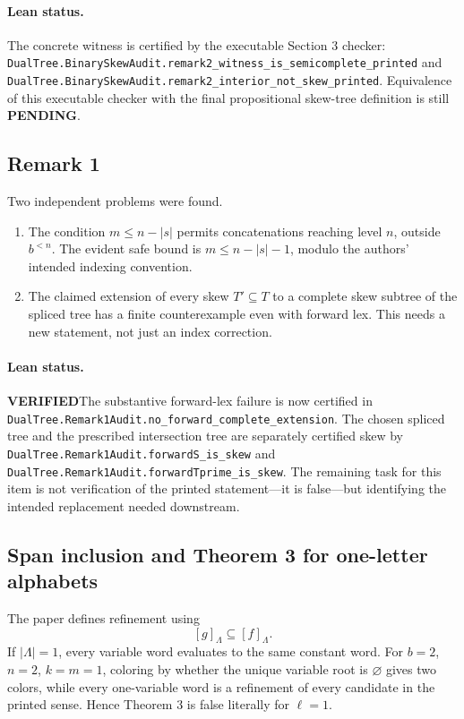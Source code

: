 \documentclass[11pt]{article}
\newcommand{\ok}{\textcolor{green!40!black}{\textbf{VERIFIED}}}
\newcommand{\todo}{\textcolor{gray!70!black}{\textbf{PENDING}}}
\newcommand{\lean}[1]{\texttt{#1}}
\begin{document}
\paragraph{Lean status.}
The concrete witness is certified by the executable Section 3 checker:
\lean{DualTree.BinarySkewAudit.remark2_witness_is_semicomplete_printed} and
\lean{DualTree.BinarySkewAudit.remark2_interior_not_skew_printed}.  Equivalence
of this executable checker with the final propositional skew-tree definition
is still \todo.

\subsection{Remark 1}
Two independent problems were found.
\begin{enumerate}[label=(\alph*)]
\item The condition $m\le n-|s|$ permits concatenations reaching level $n$,
outside $b^{<n}$.  The evident safe bound is $m\le n-|s|-1$, modulo the
authors' intended indexing convention.
\item The claimed extension of every skew $T'\subseteq T$ to a complete skew
subtree of the spliced tree has a finite counterexample even with forward lex.
This needs a new statement, not just an index correction.
\end{enumerate}

\paragraph{Lean status.}
\ok The substantive forward-lex failure is now certified in
\lean{DualTree.Remark1Audit.no_forward_complete_extension}.  The chosen
spliced tree and the prescribed intersection tree are separately certified
skew by \lean{DualTree.Remark1Audit.forwardS_is_skew} and
\lean{DualTree.Remark1Audit.forwardTprime_is_skew}.  The remaining task for
this item is not verification of the printed statement---it is false---but
identifying the intended replacement needed downstream.

\subsection{Span inclusion and Theorem 3 for one-letter alphabets}
The paper defines refinement using
\[
[g]_{\Lambda}\subseteq[f]_{\Lambda}.
\]
If $|\Lambda|=1$, every variable word evaluates to the same constant word.
For $b=2$, $n=2$, $k=m=1$, coloring by whether the unique variable root is
$\varnothing$ gives two colors, while every one-variable word is a refinement
of every candidate in the printed sense.  Hence Theorem 3 is false literally
for $\ell=1$.
\end{document}
